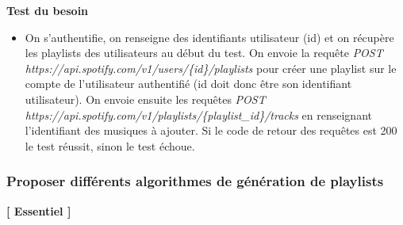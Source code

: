 \documentclass{article}
\begin{document}
		\textbf{Test du besoin}
		\begin{itemize}
			\item On s'authentifie, on renseigne des identifiants utilisateur (id) et on récupère les playlists des utilisateurs au début du test. On envoie la requête \textit{POST https://api.spotify.com/v1/users/\{id\}/playlists} pour créer une playlist sur le compte de l'utilisateur authentifié (id doit donc être son identifiant utilisateur). On envoie ensuite les requêtes \textit{POST https://api.spotify.com/v1/playlists/\{playlist\_id\}\newline/tracks} en renseignant l'identifiant des musiques à ajouter. Si le code de retour des requêtes est 200 le test réussit, sinon le test échoue.
		\end{itemize}
		\subsubsection{Proposer différents algorithmes de génération de playlists}\label{algos}
		\textbf{[ Essentiel ]}
\end{document}
